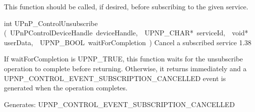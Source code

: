 \documentclass{article}
\begin{document}
\begin{cxxentry}
\begin{cxxfunction}
\begin{cxxdoc}
This function should be called, if desired, before subscribing to
the given service.


\end{cxxdoc}
\end{cxxfunction}
\begin{cxxfunction}
{int}
        {UPnP\_ControlUnsubscribe}
        {(\ UPnPControlDeviceHandle\ deviceHandle,\ \ UPNP\_CHAR*\ serviceId,\ \ void*\ userData,\ \ UPNP\_BOOL\ waitForCompletion\ )}
        {Cancel a subscribed service }
        {1.38}
\cxxSee{\strut}
\begin{cxxdoc}

If waitForCompletion is UPNP\_TRUE, this function waits for the
unsubscribe operation to complete before returning.  Otherwise, it
returns immediately and a UPNP\_CONTROL\_EVENT\_SUBSCRIPTION\_CANCELLED
event is generated when the operation completes.

Generates:
UPNP\_CONTROL\_EVENT\_SUBSCRIPTION\_CANCELLED


\end{cxxdoc}
\end{cxxfunction}
\end{cxxentry}
\end{document}
